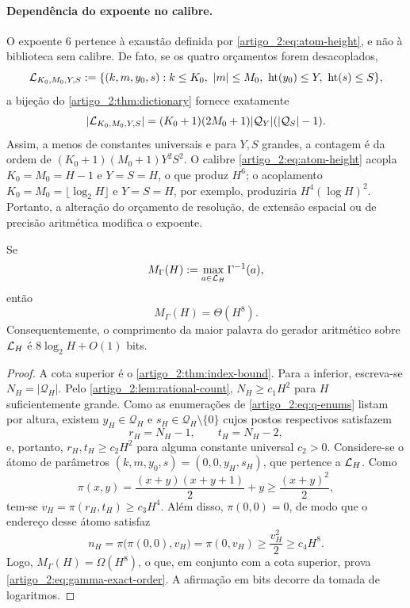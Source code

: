 \paragraph{Dependência do expoente no calibre.}
O expoente $6$ pertence à exaustão definida por \eqref{artigo_2:eq:atom-height}, e não à
biblioteca sem calibre. De fato, se os quatro orçamentos forem desacoplados,
\[
 \mathcal{L}_{K_0,M_0,Y,S}
 :=\{(k,m,y_0,s):k\le K_0,\ |m|\le M_0,
       \ \operatorname{ht}(y_0)\le Y,\ \operatorname{ht}(s)\le S\},
\]
a bijeção do \cref{artigo_2:thm:dictionary} fornece exatamente
\[
 |\mathcal{L}_{K_0,M_0,Y,S}|
 =(K_0+1)(2M_0+1)|\mathcal Q_Y|
   (|\mathcal Q_S|-1).
\]
Assim, a menos de constantes universais e para $Y,S$ grandes, a contagem é da ordem
de $(K_0+1)(M_0+1)Y^2S^2$. O calibre
\eqref{artigo_2:eq:atom-height} acopla $K_0=M_0=H-1$ e $Y=S=H$, o que produz $H^6$;
o acoplamento $K_0=M_0=\lfloor\log_2H\rfloor$ e $Y=S=H$, por exemplo,
produziria $H^4(\log H)^2$. Portanto, a alteração do orçamento de resolução, de extensão
espacial ou de precisão aritmética modifica o expoente.

\begin{proposition}\label{map:artigo_2:3.3}
\label{artigo_2:prop:gamma-exact-order}
Se
\[
 M_\Gamma(H):=\max_{a\in\mathcal{L}_H}\Gamma^{-1}(a),
\]
então
\begin{equation}
 M_\Gamma(H)=\Theta(H^8).
 \label{artigo_2:eq:gamma-exact-order}
\end{equation}
Consequentemente, o comprimento da maior palavra do gerador aritmético sobre
$\mathcal{L}_H$ é $8\log_2H+O(1)$ bits.
\end{proposition}

\begin{proof}
A cota superior é o \cref{artigo_2:thm:index-bound}. Para a inferior, escreva-se
$N_H=|\mathcal Q_H|$. Pelo \cref{artigo_2:lem:rational-count}, $N_H\ge c_1H^2$ para
$H$ suficientemente grande. Como as enumerações de \eqref{artigo_2:eq:q-enums} listam
por altura, existem $y_H\in\mathcal Q_H$ e
$s_H\in\mathcal Q_H\setminus\{0\}$ cujos postos respectivos satisfazem
\[
 r_H=N_H-1,\qquad t_H=N_H-2,
\]
e, portanto, $r_H,t_H\ge c_2H^2$ para alguma constante universal $c_2>0$.
Considere-se o átomo de parâmetros $(k,m,y_0,s)=(0,0,y_H,s_H)$, que pertence a
$\mathcal{L}_H$. Como
\[
 \pi(x,y)=\frac{(x+y)(x+y+1)}2+y\ge\frac{(x+y)^2}{2},
\]
tem-se $v_H=\pi(r_H,t_H)\ge c_3H^4$. Além disso,
$\pi(0,0)=0$, de modo que o endereço desse átomo satisfaz
\[
 n_H=\pi\bigl(\pi(0,0),v_H\bigr)=\pi(0,v_H)
 \ge\frac{v_H^2}{2}\ge c_4H^8.
\]
Logo, $M_\Gamma(H)=\Omega(H^8)$, o que, em conjunto com a cota superior, prova
\eqref{artigo_2:eq:gamma-exact-order}. A afirmação em bits decorre da tomada de logaritmos.
\end{proof}

